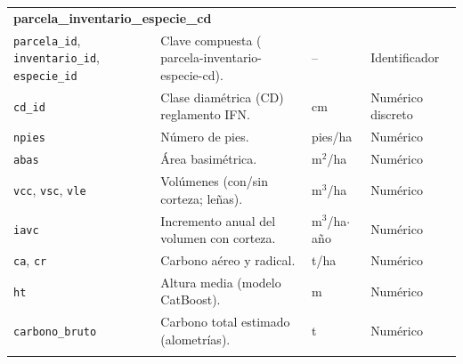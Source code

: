 \begin{longtable}{@{}p{2.8cm} p{6.8cm} p{2.2cm} p{2.2cm}@{}}
    \multicolumn{4}{l}{\textbf{parcela\_inventario\_especie\_cd}}                                                                                                                                  \\
    \texttt{parcela\_id}, \texttt{inventario\_id}, \texttt{especie\_id}    & Clave compuesta ( parcela-inventario-especie-cd).              & --                           & Identificador         \\
    \texttt{cd\_id}                                                        & Clase diamétrica (CD) reglamento IFN.                          & cm                           & Numérico discreto     \\
    \texttt{npies}                                                         & Número de pies.                                                & pies/ha                      & Numérico              \\
    \texttt{abas}                                                          & Área basimétrica.                                              & m$^{2}$/ha                   & Numérico              \\
    \texttt{vcc}, \texttt{vsc}, \texttt{vle}                               & Volúmenes (con/sin corteza; leñas).                            & m$^{3}$/ha                   & Numérico              \\
    \texttt{iavc}                                                          & Incremento anual del volumen con corteza.                      & m$^{3}$/ha$\cdot$año         & Numérico              \\
    \texttt{ca}, \texttt{cr}                                               & Carbono aéreo y radical.                                       & t/ha                         & Numérico              \\
    \texttt{ht}                                                            & Altura media (modelo CatBoost).                                & m                            & Numérico              \\
    \texttt{carbono\_bruto}                                                & Carbono total estimado (alometrías).                           & t                            & Numérico              \\
    \addlinespace


\end{longtable}
